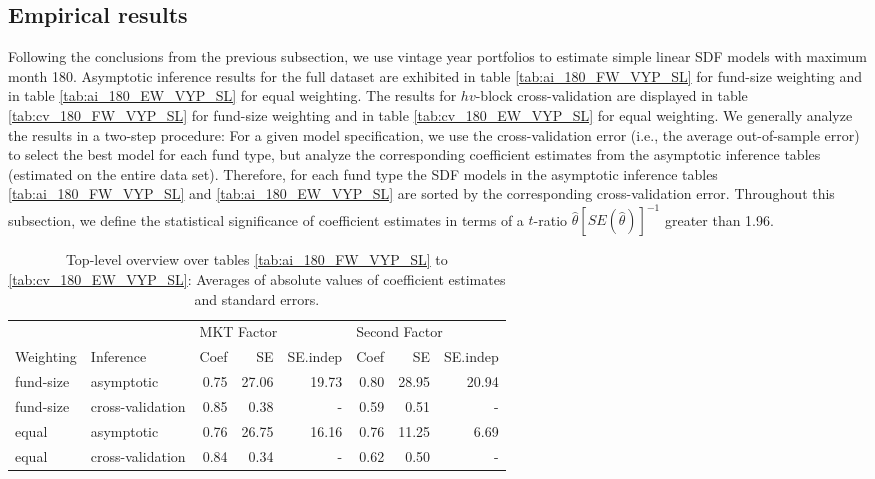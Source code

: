\documentclass[12pt]{article}
\begin{document}
\subsection{Empirical results}

Following the conclusions from the previous subsection, we use vintage year portfolios to estimate simple linear SDF models with maximum month 180.
Asymptotic inference results for the full dataset are exhibited in table \ref{tab:ai_180_FW_VYP_SL} for fund-size weighting and in table \ref{tab:ai_180_EW_VYP_SL} for equal weighting.
The results for $hv$-block cross-validation are displayed in table \ref{tab:cv_180_FW_VYP_SL} for fund-size weighting and in table \ref{tab:cv_180_EW_VYP_SL} for equal weighting.
We generally analyze the results in a two-step procedure: For a given model specification, we use the cross-validation error (i.e., the average out-of-sample error) to select the best model for each fund type, but analyze the corresponding coefficient estimates from the asymptotic inference tables (estimated on the entire data set).
Therefore, for each fund type the SDF models in the asymptotic inference tables \ref{tab:ai_180_FW_VYP_SL} and \ref{tab:ai_180_EW_VYP_SL} are sorted by the corresponding cross-validation error.
Throughout this subsection, we define the statistical significance of coefficient estimates in terms of a $t$-ratio $\hat{\theta}[SE(\hat{\theta})]^{-1}$ greater than 1.96.

\begin{table}[ht]
	\centering
	\begin{tabular}{llrrrrrr}
		& & \multicolumn{3}{l}{MKT Factor} & \multicolumn{3}{l}{Second Factor} \\ 
		Weighting & Inference & Coef & SE & SE.indep & Coef & SE & SE.indep \\ 
		\hline
		\hline
		fund-size & asymptotic & 0.75 & 27.06 & 19.73 & 0.80 & 28.95 & 20.94 \\ 
		fund-size & cross-validation & 0.85 & 0.38 & - & 0.59 & 0.51 & - \\ 
		\hline
		equal & asymptotic & 0.76 & 26.75 & 16.16 & 0.76 & 11.25 & 6.69 \\ 
		equal & cross-validation & 0.84 & 0.34 & - & 0.62 & 0.50 & - \\ 
		\hline
		\hline
	\end{tabular}
	\caption{
		Top-level overview over tables \ref{tab:ai_180_FW_VYP_SL} to \ref{tab:cv_180_EW_VYP_SL}: 
		Averages of absolute values of coefficient estimates and standard errors.
	} 
	\label{tab:ai_sum_abs}
\end{table}
\end{document}
